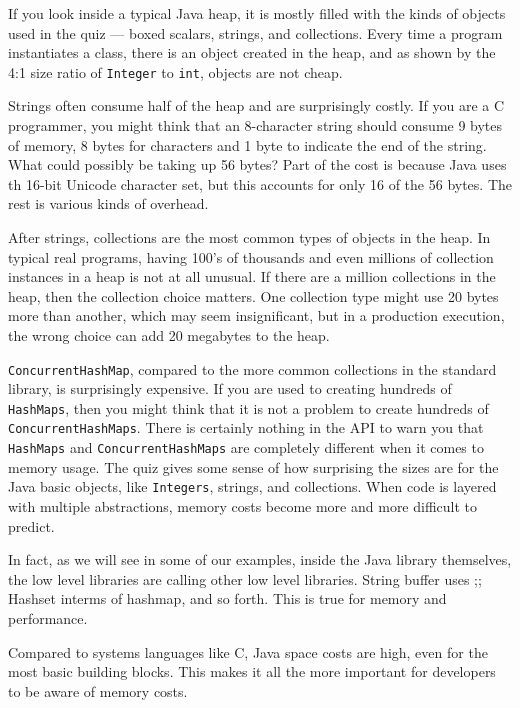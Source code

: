 If you look inside a typical Java heap, it is mostly filled with the kinds of objects used in the quiz --- boxed scalars, 
strings, and collections. Every time a program instantiates a class, there is an object created in the heap, and as 
shown by the 4:1 size ratio of \texttt{Integer} to \texttt{int}, objects are not cheap. 

Strings often consume half of the heap and are surprisingly costly. 
If you are a C programmer, you might think that an 8-character string should consume 9 bytes of memory, 
8 bytes for characters and 1 byte to indicate the end of the string. What could possibly be taking up 56 bytes? 
Part of the cost is because Java uses th 16-bit Unicode character set, but this accounts for only 16 of the 56 bytes. 
The rest is various kinds of overhead.

After strings, collections are the most common types of objects in the heap. In typical real programs, having 100's of 
thousands and even millions of collection instances in a heap is not at all unusual. If there are a million collections 
in the heap, then the collection choice matters. One collection type might use 20 bytes more than another, 
which may seem insignificant, but in a production execution, the wrong choice can add 20 megabytes to the heap.

\texttt{ConcurrentHashMap}, compared to the more common collections in the standard library, is surprisingly expensive. 
If you are used to creating hundreds of \texttt{HashMaps}, then you might think that it is not a problem to create hundreds 
of \texttt{ConcurrentHashMaps}. There is certainly nothing in the API to warn you that \texttt{HashMaps} and 
\texttt{ConcurrentHashMaps} are completely different when it comes to memory usage. 
The quiz gives some sense of how surprising the sizes are for the Java basic objects, like \texttt{Integers}, 
strings, and collections. When code is layered with multiple abstractions, memory costs become more and more difficult 
to predict.



In fact, as we will see in some of our examples, inside the Java library themselves, the low level libraries are calling
 other low level libraries.  String buffer uses ;;  Hashset interms of hashmap, and so forth.  
 This is true for memory and performance.

Compared to systems languages like C, Java space costs are high, even for the most basic building blocks. 
This makes it all the more important for developers to be aware of memory costs.


